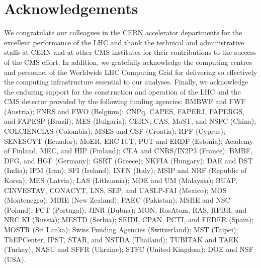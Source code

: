\section*{Acknowledgements}
We congratulate our colleagues in the CERN accelerator departments for the excellent performance of the LHC
and thank the technical and administrative staffs at CERN and at other CMS institutes for their contributions
to the success of the CMS effort. In addition, we gratefully acknowledge the computing centres and personnel
of the Worldwide LHC Computing Grid for delivering so effectively the computing infrastructure essential to
our analyses. Finally, we acknowledge the enduring support for the construction and operation of the LHC and
the CMS detector provided by the following funding agencies: BMBWF and FWF (Austria); FNRS and FWO (Belgium);
CNPq, CAPES, FAPERJ, FAPERGS, and FAPESP (Brazil); MES (Bulgaria); CERN; CAS, MoST, and NSFC (China);
COLCIENCIAS (Colombia); MSES and CSF (Croatia); RPF (Cyprus); SENESCYT (Ecuador); MoER, ERC IUT, PUT and ERDF
(Estonia); Academy of Finland, MEC, and HIP (Finland); CEA and CNRS/IN2P3 (France); BMBF, DFG, and HGF
(Germany); GSRT (Greece); NKFIA (Hungary); DAE and DST (India); IPM (Iran); SFI (Ireland); INFN (Italy); MSIP
and NRF (Republic of Korea); MES (Latvia); LAS (Lithuania); MOE and UM (Malaysia); BUAP, CINVESTAV, CONACYT,
LNS, SEP, and UASLP-FAI (Mexico); MOS (Montenegro); MBIE (New Zealand); PAEC (Pakistan); MSHE and NSC
(Poland); FCT (Portugal); JINR (Dubna); MON, RosAtom, RAS, RFBR, and NRC KI (Russia); MESTD (Serbia); SEIDI,
CPAN, PCTI, and FEDER (Spain); MOSTR (Sri Lanka); Swiss Funding Agencies (Switzerland); MST (Taipei);
ThEPCenter, IPST, STAR, and NSTDA (Thailand); TUBITAK and TAEK (Turkey); NASU and SFFR (Ukraine); STFC (United
Kingdom); DOE and NSF (USA).

